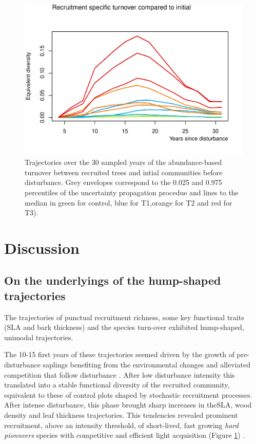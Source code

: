 \documentclass[fleqn,10pt]{ArtEcoFoG} %
\begin{document}
\begin{figure}

{\centering \includegraphics{RecruitmentTrajectories_files/figure-latex/Fig4-1} 

}

\caption{Trajectories over the 30 sampled years of the abundance-based turnover between recruited trees and intial communities before disturbance. Grey envelopes correspond to the 0.025 and 0.975 percentiles of the uncertainty propagation procedue and lines to the median in green for control, blue for T1,orange for T2 and red for T3).}\label{fig:Fig4}
\end{figure}

\section{Discussion}\label{discussion}

\subsection{On the underlyings of the hump-shaped
trajectories}\label{on-the-underlyings-of-the-hump-shaped-trajectories}

The trajectories of punctual recruitment richness, some key functional
traits (SLA and bark thickness) and the species turn-over exhibited
hump-shaped, unimodal trajectories.

The 10-15 first years of these trajectories seemed driven by the growth
of pre-disturbance saplings benefiting from the environmental changes
and alleviated competition that follow disturbance \citep{Herault2010}.
After low disturbance intensity this translated into a stable functional
diversity of the recruited community, equivalent to these of control
plots shaped by stochastic recruitment processes. After intense
disturbance, this phase brought sharp increases in theSLA, wood density
and leaf thickness trajectories. This tendencies revealed prominent
recruitment, above an intensity threshold, of short-lived, fast growing
\emph{hard pionneers} species with competitive and efficient light
acquisition (Figure \ref{fig:Fig4})
\citep{Wright2004, Chave2009b, Herault2011, Reich2014}.
\end{document}
